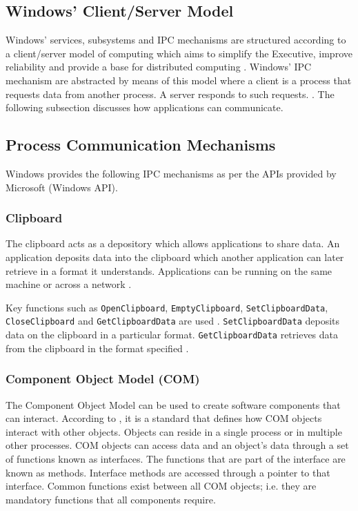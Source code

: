 \documentclass[12pt,a4paper,oneside]{article}
\def\code#1{\texttt{#1}}
\begin{document}
\begin{spacing}{1.4}
\subsection{Windows' Client/Server Model}
Windows' services, subsystems and IPC mechanisms are structured according to a client/server model of computing which aims to simplify the Executive, improve reliability and provide a base for distributed computing \citep{OSInternals&DesignPrinciplesStallings}. Windows' IPC mechanism are abstracted by means of this model where a client is a process that requests data from another process. A server responds to such requests. \citep{MSDN_IPCExplanation}. The following subsection discusses how applications can communicate.
\subsection{Process Communication Mechanisms}
Windows provides the following IPC mechanisms as per the APIs provided by Microsoft (Windows API).
\subsubsection{Clipboard}
The clipboard acts as a depository which allows applications to share data. An application deposits data into the clipboard which another application can later retrieve in a format it understands. Applications can be running on the same machine or across a network \citep{MSDN_IPCExplanation}.

Key functions such as \code{OpenClipboard}, \code{EmptyClipboard}, \code{SetClipboardData}, \code{CloseClipboard} and \code{GetClipboardData} are used \citep{IPCWindowsLinkedInSlides}. \code{SetClipboardData} deposits data on the clipboard in a particular format. \code{GetClipboardData} retrieves data from the clipboard in the format specified \citep{MSDN_API}.
\subsubsection{Component Object Model (COM)}
The Component Object Model can be used to create software components that can interact. According to \cite{MSDN_API}, it is a standard that defines how COM objects interact with other objects. Objects can reside in a single process or in multiple other processes. COM objects can access data and an object's data through a set of functions known as interfaces. The functions that are part of the interface are known as methods. Interface methods are accessed through a pointer to that interface. Common functions exist between all COM objects; i.e. they are mandatory functions that all components require.

\end{spacing}
\end{document}
